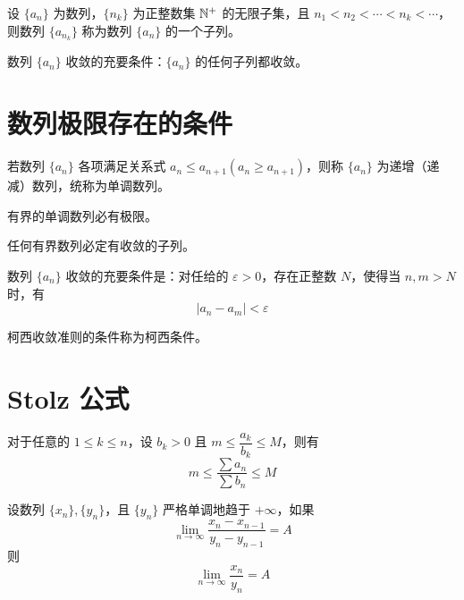\begin{definition}[数列的子列]
	设 $\{a_n\}$ 为数列，$\{n_k\}$ 为正整数集 $\mathbb{N}^+$ 的无限子集，且 $n_1<n_2<\cdots<n_k<\cdots$，则数列 $\{a_{n_k}\}$ 称为数列 $\{a_n\}$ 的一个子列。
\end{definition}

\begin{theorem}
	数列 $\{a_n\}$ 收敛的充要条件：$\{a_n\}$ 的任何子列都收敛。
\end{theorem}

\section{数列极限存在的条件}

\begin{definition}
	若数列 $\{a_n\}$ 各项满足关系式 $a_n \leqslant a_{n+1}(a_n \geqslant a_{n+1})$，则称 $\{a_n\}$ 为递增（递减）数列，统称为单调数列。
\end{definition}

\begin{theorem}[单调有界定理]
	有界的单调数列必有极限。
\end{theorem}

\begin{theorem}[致密性定理]
	任何有界数列必定有收敛的子列。
\end{theorem}

\begin{theorem}
	数列 $\{a_n\}$ 收敛的充要条件是：对任给的 $\varepsilon >0$，存在正整数 $N$，使得当 $n,m>N$ 时，有 
	$$|a_n-a_m| < \varepsilon$$
\end{theorem}

柯西收敛准则的条件称为柯西条件。

\section{Stolz 公式}

\begin{theorem}
	对于任意的 $1 \leqslant k \leqslant n$，设 $b_k>0$ 且 $m \leqslant \dfrac{a_k}{b_k} \leqslant M$，则有
	$$m \leqslant \frac{\sum a_n}{\sum b_n} \leqslant M$$
\end{theorem}

\begin{theorem}
	设数列 $\{x_n\},\{y_n\}$，且 $\{y_n\}$ 严格单调地趋于 $+\infty$，如果
	$$\lim_{n\to \infty}\frac{x_n-x_{n-1}}{y_n-y_{n-1}}=A$$
	则
	$$\lim_{n\to \infty} \frac{x_n}{y_n} = A$$
\end{theorem}

